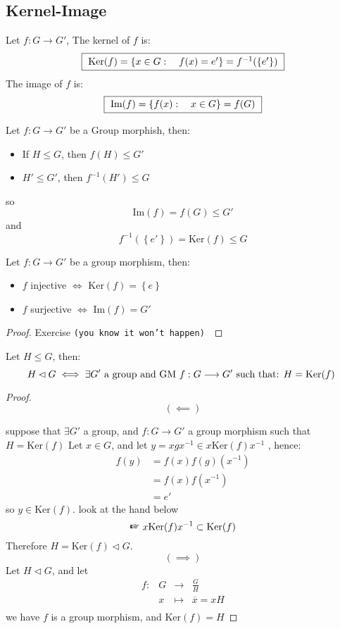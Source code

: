 \subsection{Kernel-Image}
Let $ f : G \longrightarrow G'$, The kernel of $f $ 
is: 
\[
  \fbox{ 
    $
  \text{Ker}(f) =
  \left\{ x \in   G: \quad 
  f(x)  = e' \right\} = 
  f^{-1}(\left\{ e' \right\}) 
  $
  }
\]
The image of $f $ is: 
\[
  \fbox{ 
    $
  \text{Im}(f)   = 
  \left\{ f(x): \quad x \in  G \right\} = f(G) 
  $
  }
\]
\begin{proposition}[]
Let $ f : G \longrightarrow G' $ be a 
Group morphish, then:
\begin{itemize}
  \item [\ding{172}] If $H \leq G $, then
    $f(H)  \leq G' $ 
  \item [\ding{173}] $H ' \leq G ' $, then 
    $f^{-1}(H')  \leq  G $ 
\end{itemize}
so 
\[
\text{Im}  (f) = f(G)  \leq  G' 
\]
and 
\[
f^{-1}( \left\{ e' \right\})  = 
\text{Ker}  (f)  \leq G
\]
\end{proposition}
\begin{proposition}[]
Let $ f : G \longrightarrow G' $ be a group
morphism, then: 
\begin{itemize}
  \item [\ding{172}] $f $ injective $\iff  $ 
    $\text{Ker}  (f)  = \left\{ e \right\} $ 
  \item [\ding{173}] $f $ surjective $\iff  $ 
    $\text{Im}  (f) = G'  $ 
\end{itemize}
\end{proposition}
\begin{proof}
  Exercise \tt (you know it won't happen)  \normalfont
\end{proof}
\begin{proposition}[]
Let $H \leq G $, then: 
\[
H \lhd G \iff \exists G' \text{ a group and GM $ f : G \longrightarrow G'$ such that: $H = \text{Ker}  (f)  $ }  
\]
\end{proposition}
\begin{proof}
  \[
    ( \impliedby  ) 
  \]
  
  suppose that $\exists G' $ a group, and $ f : G \longrightarrow G' $ a group morphism such that $H = \text{Ker}  (f)$ 
Let $x \in  G $, and let $y = x gx^{-1} \in  x \text{Ker}  (f) x^{-1} $ , hence: 
\begin{align*}
  f(y)  
  &= 
  f(x) f(g) (x^{-1})  \\
  &= 
  f(x) f(x^{-1})  \\
  &= e' 
\end{align*}
so $y \in   \text{Ker}  (f)  $. look at the hand below
\[
  \text{\ding{43} }  x \text{Ker} (f) x^{-1} \subset 
  \text{Ker}(f) 
\]
Therefore $H = \text{Ker}  (f) \lhd G $.
\[
\left( \implies  \right) 
\]
Let $H \lhd  G$, and let \[
\begin{array}{cccc}
      f : &  G  & \longrightarrow & \frac{G}{H} \\

           &  x  & \longmapsto     & \overline{x} =
           x H\\ 
\end{array}
\]
we have $f $ is a group morphism, and $\text{Ker}  (f) = H$ 
\end{proof}

